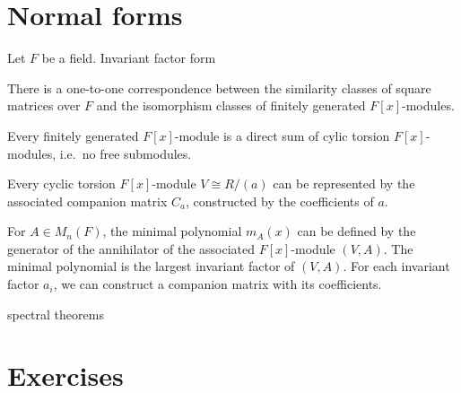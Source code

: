 \documentclass{../../large}
\begin{document}
\begin{prb}
\end{prb}








\section{Normal forms}
\begin{prb}
Let $F$ be a field.
Invariant factor form
\begin{parts}
\item There is a one-to-one correspondence between the similarity classes of square matrices over $F$ and the isomorphism classes of finitely generated $F[x]$-modules.
\item Every finitely generated $F[x]$-module is a direct sum of cylic torsion $F[x]$-modules, i.e.~no free submodules.
\item Every cyclic torsion $F[x]$-module $V\cong R/(a)$ can be represented by the associated companion matrix $C_a$, constructed by the coefficients of $a$.
\end{parts}
\end{prb}

For $A\in M_n(F)$, the minimal polynomial $m_A(x)$ can be defined by the generator of the annihilator of the associated $F[x]$-module $(V,A)$.
The minimal polynomial is the largest invariant factor of $(V,A)$.
For each invariant factor $a_i$, we can construct a companion matrix with its coefficients.



\begin{prb}
\end{prb}




\begin{prb}
\end{prb}

spectral theorems

\section*{Exercises}
\end{document}
